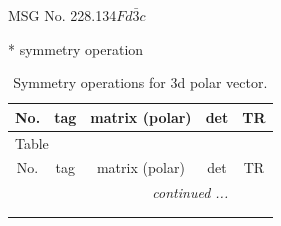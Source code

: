 \documentclass[fleqn,8pt]{jsarticle}
\begin{document}
\setcounter{MaxMatrixCols}{32}

\renewcommand{\tablename}{Table~}
\renewcommand{\figurename}{Figure~}
\begin{center}
\LARGE
MSG No. 228.134\quad$Fd\bar{3}c$
\end{center}
* symmetry operation
\renewcommand{\arraystretch}{1.3}
\begin{longtable}{ccccc}
\caption{Symmetry operations for 3d polar vector.}
 \\
 \hline \hline
No. & tag & matrix (polar) & det & TR \\ \hline \endfirsthead

\multicolumn{4}{l}{\tablename\ \thetable{}} \\
 \hline \hline
No. & tag & matrix (polar) & det & TR \\ \hline \endhead

 \hline \hline
\multicolumn{4}{r}{\footnotesize\it continued ...} \\ \endfoot

 \hline \hline
\multicolumn{4}{r}{} \\ \endlastfoot


\end{longtable}
\end{document}
